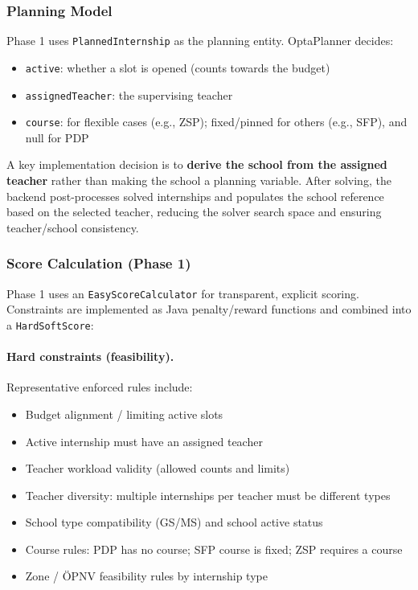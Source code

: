 \documentclass[12pt,a4paper]{report}
\begin{document}
\subsubsection*{Planning Model}

Phase 1 uses \texttt{PlannedInternship} as the planning entity. OptaPlanner decides:

\begin{itemize}
    \item \texttt{active}: whether a slot is opened (counts towards the budget)
    \item \texttt{assignedTeacher}: the supervising teacher
    \item \texttt{course}: for flexible cases (e.g., ZSP); fixed/pinned for others (e.g., SFP), and null for PDP
\end{itemize}

A key implementation decision is to \textbf{derive the school from the assigned teacher} rather than making the school a planning variable. After solving, the backend post-processes solved internships and populates the school reference based on the selected teacher, reducing the solver search space and ensuring teacher/school consistency.

\subsubsection*{Score Calculation (Phase 1)}

Phase 1 uses an \texttt{EasyScoreCalculator} for transparent, explicit scoring. Constraints are implemented as Java penalty/reward functions and combined into a \texttt{HardSoftScore}:

\paragraph{Hard constraints (feasibility).}
Representative enforced rules include:
\begin{itemize}
    \item Budget alignment / limiting active slots
    \item Active internship must have an assigned teacher
    \item Teacher workload validity (allowed counts and limits)
    \item Teacher diversity: multiple internships per teacher must be different types
    \item School type compatibility (GS/MS) and school active status
    \item Course rules: PDP has no course; SFP course is fixed; ZSP requires a course
    \item Zone / ÖPNV feasibility rules by internship type
\end{itemize}
\end{document}
